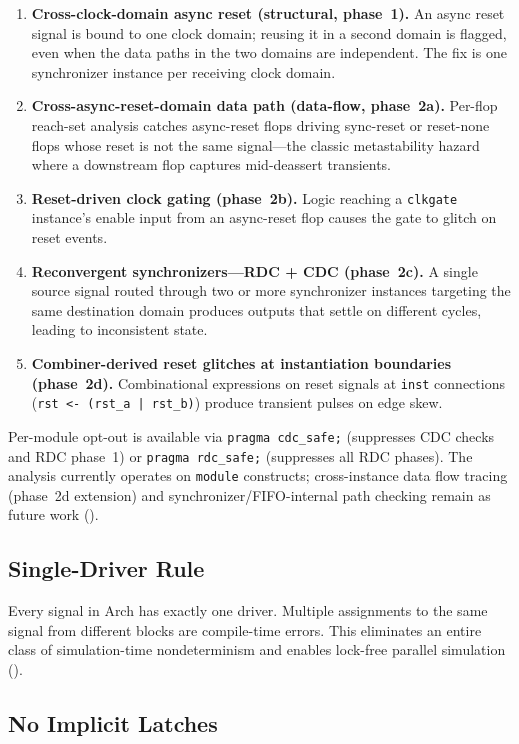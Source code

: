 \documentclass[11pt,twocolumn]{article}
\begin{document}
\begin{enumerate}[leftmargin=*,nosep]
\item \textbf{Cross-clock-domain async reset (structural, phase~1).} An async reset signal is bound to one clock domain; reusing it in a second domain is flagged, even when the data paths in the two domains are independent. The fix is one synchronizer instance per receiving clock domain.
\item \textbf{Cross-async-reset-domain data path (data-flow, phase~2a).} Per-flop reach-set analysis catches async-reset flops driving sync-reset or reset-none flops whose reset is not the same signal---the classic metastability hazard where a downstream flop captures mid-deassert transients.
\item \textbf{Reset-driven clock gating (phase~2b).} Logic reaching a \texttt{clkgate} instance's enable input from an async-reset flop causes the gate to glitch on reset events.
\item \textbf{Reconvergent synchronizers---RDC + CDC (phase~2c).} A single source signal routed through two or more synchronizer instances targeting the same destination domain produces outputs that settle on different cycles, leading to inconsistent state.
\item \textbf{Combiner-derived reset glitches at instantiation boundaries (phase~2d).} Combinational expressions on reset signals at \texttt{inst} connections (\texttt{rst <- (rst\_a | rst\_b)}) produce transient pulses on edge skew.
\end{enumerate}

Per-module opt-out is available via \texttt{pragma cdc\_safe;} (suppresses CDC checks and RDC phase~1) or \texttt{pragma rdc\_safe;} (suppresses all RDC phases). The analysis currently operates on \texttt{module} constructs; cross-instance data flow tracing (phase~2d extension) and synchronizer/FIFO-internal path checking remain as future work ().

\subsection{Single-Driver Rule}

Every signal in Arch has exactly one driver. Multiple assignments to the same signal from different blocks are compile-time errors. This eliminates an entire class of simulation-time nondeterminism and enables lock-free parallel simulation ().

\subsection{No Implicit Latches}
\end{document}
